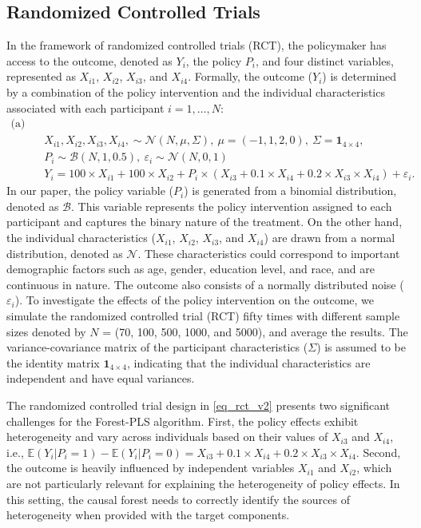\documentclass[12pt]{article}
\begin{document}
\subsection{Randomized Controlled Trials}
In the framework of randomized controlled trials (RCT), the policymaker has access to the outcome, denoted as $Y_i$, the policy $P_i$, and four distinct variables, represented as $X_{i1}$, $X_{i2}$, $X_{i3}$, and $X_{i4}$. Formally, the outcome ($Y_i$) is determined by a combination of the policy intervention and the individual characteristics associated with each participant $i = 1, \dots, N$:  
\begin{align} 
    \text{(a) RCT} & \nonumber \\
    &X_{i1}, X_{i2}, X_{i3}, X_{i4}, \sim \mathcal{N}(N, \mu, \Sigma), \ \mu = (-1, 1, 2, 0), \ \Sigma = \mathbf{1}_{4 \times 4}, \nonumber \\
    &P_i \sim  \mathcal{B}(N, 1, 0.5), \  \varepsilon_i \sim \mathcal{N}(N, 0, 1) \nonumber \\
    & Y_i  =  100\times X_{i1} + 100\times X_{i2} + P_i\times (X_{i3} + 0.1\times X_{i4} + 0.2\times X_{i3}\times X_{i4}) + \varepsilon_i.\label{eq_rct_v2}
\end{align}
In our paper, the policy variable ($P_i$) is generated from a binomial distribution, denoted as $\mathcal{B}$. This variable represents the policy intervention assigned to each participant and captures the binary nature of the treatment.
On the other hand, the individual characteristics ($X_{i1}$, $X_{i2}$, $X_{i3}$, and $X_{i4}$) are drawn from a normal distribution, denoted as $\mathcal{N}$. These characteristics could correspond to important demographic factors such as age, gender, education level, and race, and are continuous in nature. The outcome also consists of a normally distributed noise ($\varepsilon_i$). To investigate the effects of the policy intervention on the outcome, we simulate the randomized controlled trial (RCT) fifty times with different sample sizes denoted by $N$ = (70, 100, 500, 1000, and 5000), and average the results. The variance-covariance matrix of the participant characteristics ($\Sigma$) is assumed to be the identity matrix $\mathbf{1}_{4 \times 4}$, indicating that the individual characteristics are independent and have equal variances.


The randomized controlled trial design in \eqref{eq_rct_v2} presents two significant challenges for the Forest-PLS algorithm. First, the policy effects exhibit heterogeneity and vary across individuals based on their values of $X_{i3}$ and $X_{i4}$, i.e., $\mathbb{E}(Y_i|P_i = 1) - \mathbb{E}(Y_i|P_i = 0)  = X_{i3} + 0.1\times X_{i4} + 0.2\times X_{i3}\times X_{i4}$.  Second, the outcome is heavily influenced by independent variables $X_{i1}$ and $X_{i2}$, which are not particularly relevant for explaining the heterogeneity of policy effects. In this setting, the causal forest needs to correctly identify the sources of heterogeneity when provided with the target components.
\end{document}
